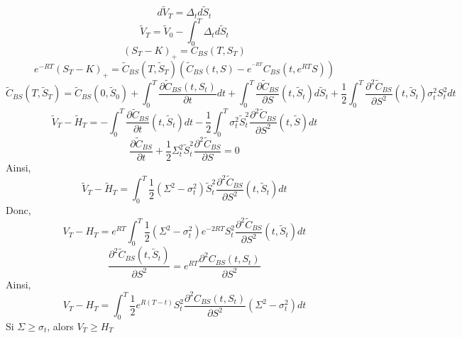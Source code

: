 \documentclass{article}
\theoremstyle{plain}
\theoremstyle{definition}
\begin{document}
\begin{equation}
d\tilde{V}_T=\Delta_td\tilde{S}_t
\end{equation}
\begin{equation}
\tilde{V}_T=\tilde{V}_0-\int_0^T\Delta_td\tilde{S}_t
\end{equation}
\begin{equation}
(S_T-K)_+=C_{BS}(T,S_T)
\end{equation}
\begin{equation}
e^{-RT}(S_T-K)_+=\tilde{C}_{BS}(T,\tilde{S}_T)(\tilde{C}_{BS}(t,S)-e^^{-RT}C_{BS}(t,e^{RT}S))
\end{equation}
\begin{equation}
\tilde{C}_{BS}(T,\tilde{S}_T)=\tilde{C}_{BS}(0,\tilde{S}_0)+\int_0^T\frac{\partial \tilde{C}_{BS}(t,S_t)}{\partial t}dt+\int_0^T\frac{\partial\tilde{C}_{BS}}{\partial S}(t,\tilde{S}_t)d\tilde{S}_t+\frac{1}{2}\int_0^T\frac{\partial^2 \tilde{C}_{BS}}{\partial S^2}(t,\tilde{S}_t)\sigma_t^2S_t^2dt
\end{equation}
\begin{equation}
\tilde{V}_T-\tilde{H}_T=-\int_0^T\frac{\partial \tilde{C}_{BS}}{\partial t}(t,\tilde{S}_t)dt-\frac{1}{2}\int_0^T\sigma_t^2\tilde{S}_t^2\frac{\partial^2\tilde{C}_{BS}}{\partial S^2}(t,\tilde{S})dt
\end{equation}
\begin{equation}
\frac{\partial\tilde{C}_{BS}}{\partial t}+\frac{1}{2}\Sigma_t^2\tilde{S}_t^2\frac{\partial^2\tilde{C}_{BS}}{\partial S}=0
\end{equation}
Ainsi,
\begin{equation}
\tilde{V}_T-\tilde{H}_T=\int_0^T\frac{1}{2}(\Sigma^2-\sigma_t^2)\tilde{S}_t^2\frac{\partial^2\tilde{C}_{BS}}{\partial S^2}(t,\tilde{S}_t)dt
\end{equation}
Donc,
\begin{equation}
V_T-H_T=e^{RT}\int_0^T\frac{1}{2}(\Sigma^2-\sigma_t^2)e^{-2RT}S_t^2\frac{\partial^2\tilde{C}_{BS}}{\partial S^2}(t,\tilde{S}_t)dt
\end{equation}
\begin{equation}
\frac{\partial^2\tilde{C}_{BS}(t,\tilde{S}_t)}{\partial S^2}=e^{RT}\frac{\partial^2C_{BS}(t,S_t)}{\partial S^2}
\end{equation}
Ainsi,
\begin{equation}
V_T-H_T=\int_0^T\frac{1}{2}e^{R(T-t)}S_t^2\frac{\partial^2C_{BS}(t,S_t)}{\partial S^2}(\Sigma^2-\sigma^2_t)dt
\end{equation}
Si $\Sigma\geq\sigma_t$, alors $V_T\geq H_T$
\end{document}

